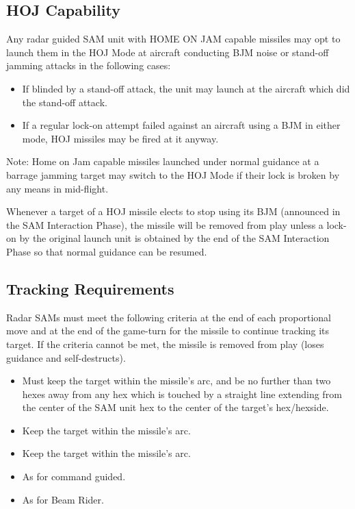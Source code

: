 \subsection{HOJ Capability} Any radar guided SAM unit with HOME ON JAM capable missiles may opt to launch them in the HOJ Mode at aircraft conducting BJM noise or stand-off jamming attacks in the following cases:

\begin{itemize}

\item If blinded by a stand-off attack, the unit may launch at the aircraft which did the stand-off attack.

\item If a regular lock-on attempt failed against an aircraft using a BJM in either mode, HOJ missiles may be fired at it anyway.

\end{itemize}

Note: Home on Jam capable missiles launched under normal guidance at a barrage jamming target may switch to the HOJ Mode if their lock is broken by any means in mid-flight.

Whenever a target of a HOJ missile elects to stop using its BJM (announced in the SAM Interaction Phase), the missile will be removed from play unless a lock-on by the original launch unit is obtained by the end of the SAM Interaction Phase so that normal guidance can be resumed.

\subsection{Tracking Requirements} Radar SAMs must meet the following criteria at the end of each proportional move and at the end of the game-turn for the missile to continue tracking its target. If the criteria cannot be met, the missile is removed from play (loses guidance and self-destructs).

\begin{itemize}
\item{} Must keep the target within the missile's  arc, and be no further than two hexes away from any hex which is touched by a straight line extending from the center of the SAM unit hex to the center of the target's hex/hexside.

\item{} Keep the target within the missile's  arc.

\item{} Keep the target within the missile's  arc.

\item{} As for command guided.

\item{} As for Beam Rider.
\end{itemize}

